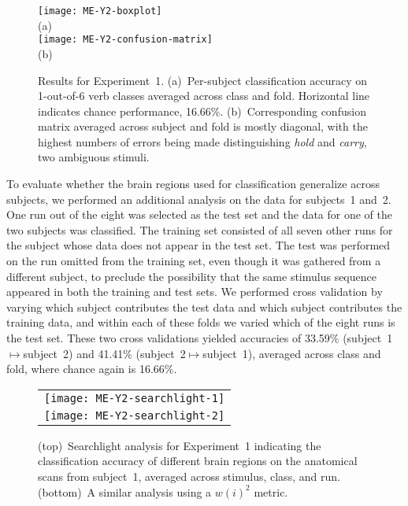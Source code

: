 \begin{figure}
  \centering
  \hspace{-3.5ex}\texttt{[image: ME-Y2-boxplot]}\\
  (a)\\[3ex]
  \texttt{[image: ME-Y2-confusion-matrix]}\\
  (b)\\
  \caption{Results for Experiment~1.
    (a)~Per-subject classification accuracy on 1-out-of-6 verb classes
    averaged across class and fold.
    Horizontal line indicates chance performance, 16.66\%.
    (b)~Corresponding confusion matrix averaged across subject and fold
    is mostly diagonal, with the highest numbers of errors
    being made distinguishing \emph{hold} and \emph{carry}, two ambiguous
    stimuli.}
  \label{fig:ME-Y2-results}
\end{figure}

To evaluate whether the brain regions used for classification generalize across
subjects, we performed an additional analysis on the data for subjects~1 and~2.
%
One run out of the eight was selected as the test set and the data for one of
the two subjects was classified.
%
The training set consisted of all seven other runs for the subject whose
data does not appear in the test set.
%
The test was performed on the run omitted from the training set, even though it
was gathered from a different subject, to preclude the possibility that the
same stimulus sequence appeared in both the training and test sets.
%
We performed cross validation by varying which subject contributes the test
data and which subject contributes the training data, and within each of these
folds we varied which of the eight runs is the test set.
%
These two cross validations yielded accuracies of 33.59\%
(subject~1$\mapsto$subject~2) and 41.41\% (subject~2$\mapsto$subject~1),
averaged across class and fold, where chance again is 16.66\%.

\begin{figure}
  \centering
  \begin{tabular}{c}
    \texttt{[image: ME-Y2-searchlight-1]}\\
    \texttt{[image: ME-Y2-searchlight-2]}
  \end{tabular}
  \caption{(top)~Searchlight analysis for Experiment~1 indicating the
    classification accuracy of different brain regions on the anatomical scans
    from subject~1, averaged across stimulus, class, and run.
    (bottom)~A similar analysis using a $w(i)^2$ metric.}
  \label{fig:ME-Y2-searchlight}
\end{figure}


